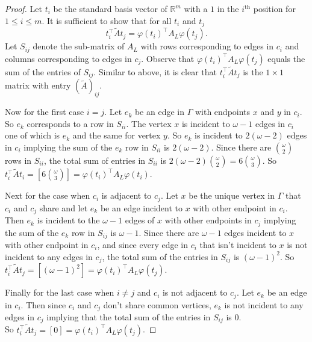 \documentclass[12pt]{report}
\theoremstyle{definition}
\begin{document}
\begin{proof}
    Let $t_i$ be the standard basis vector of $\mathbb{R}^{m}$ with a $1$  in the $i^{\text{th}}$ position for $1 \leq i \leq m$.
    It is sufficient to show that for all $t_i$ and $t_j$
    \[t_i^\top  \tilde{A}t_j = \varphi(t_i)^\top  A_L \varphi(t_j).\]
    Let $S_{ij}$ denote the sub-matrix of $A_L$ with rows corresponding to edges in $c_i$ and columns corresponding to edges in $c_j$. Observe that $\varphi(t_i)^\top  A_L \varphi(t_j)$ equals the sum of the entries of $S_{ij}$. Similar to above, it is clear that $t_i^\top  \tilde{A}t_j$ is the $1\times 1$ matrix with entry $(\tilde{A})_{ij}$.\par
    Now for the first case $i=j$. Let $e_k$ be an edge in $\Gamma$ with endpoints $x$ and $y$ in $c_i$. So $e_k$ corresponds to a row in $S_{ii}$. The vertex $x$ is incident to $\omega -1$ edges in $c_i$ one of which is $e_k$ and the same for vertex $y$. So $e_k$ is incident to $2(\omega-2)$ edges in $c_i$ implying the sum of the $e_k$ row in $S_{ii}$ is $2(\omega-2)$. Since there are $\binom{\omega}{2}$ rows in $S_{ii}$, the total sum of entries in $S_{ii}$ is $2(\omega-2)\binom{\omega}{2} = 6\binom{\omega}{3}$. So $t_i^\top  \tilde{A}t_i =\left[6\binom{\omega}{3}\right] = \varphi(t_i)^\top  A_L \varphi(t_i)$.\par
    Next for the case when $c_i$ is adjacent to $c_j$. Let $x$ be the unique vertex in $\Gamma$ that $c_i$ and $c_j$ share and let $e_k$ be an edge incident to $x$ with other endpoint in $c_i$. Then $e_k$ is incident to the $\omega-1$ edges of $x$ with other endpoints in $c_j$ implying the sum of the $e_k$ row in $S_{ij}$ is $\omega-1$. Since there are $\omega-1$ edges incident to $x$ with other endpoint in $c_i$, and since every edge in $c_i$ that isn't incident to $x$ is not incident to any edges in $c_j$, the total sum of the entries in $S_{ij}$ is $(\omega-1)^2$. So $t_i^\top  \tilde{A}t_j =\left[(\omega-1)^2\right] = \varphi(t_i)^\top  A_L \varphi(t_j)$.\par
    Finally for the last case when $i \neq j$ and $c_i$ is not adjacent to $c_j$. Let $e_k$ be an edge in $c_i$. Then since $c_i$ and $c_j$ don't share common vertices, $e_k$ is not incident to any edges in $c_j$ implying that the total sum of the entries in $S_{ij}$ is 0.\\So $t_i^\top  \tilde{A}t_j =\left[0\right] = \varphi(t_i)^\top  A_L \varphi(t_j)$.
\end{proof}
\end{document}

